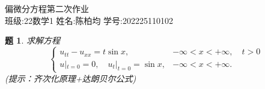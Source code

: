 \documentclass[12pt,a4paper]{article}
\newtheorem{problem}{题}
\begin{document}
	
	\begin{center}
		\LARGE 偏微分方程第二次作业 \\
		\vspace{0.5cm}
		\large 班级:22数学1 \quad 姓名:陈柏均 \quad 学号:202225110102
	\end{center}
	




\begin{problem}
	求解方程
	\[
	\begin{cases}
		u_{tt} - u_{xx} = t\sin x, & -\infty < x < +\infty, \quad t > 0 \\
		u|_{t=0} = 0, \quad u_t|_{t=0} = \sin x, & -\infty < x < +\infty.
	\end{cases}
	\]
	(提示：齐次化原理+达朗贝尔公式)
	
\end{problem}
\end{document}

